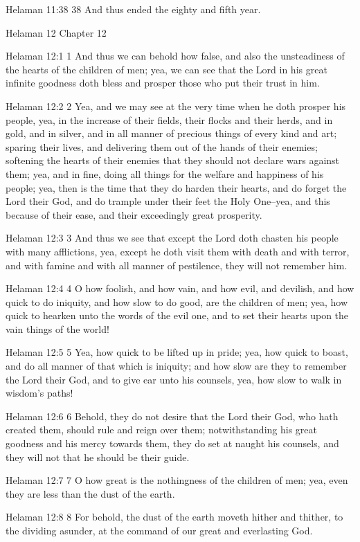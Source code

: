 Helaman 11:38
 38 And thus ended the eighty and fifth year.

Helaman 12
Chapter 12

Helaman 12:1
 1 And thus we can behold how false, and also the unsteadiness of
the hearts of the children of men; yea, we can see that the Lord
in his great infinite goodness doth bless and prosper those who
put their trust in him.

Helaman 12:2
 2 Yea, and we may see at the very time when he doth prosper his
people, yea, in the increase of their fields, their flocks and
their herds, and in gold, and in silver, and in all manner of
precious things of every kind and art; sparing their lives, and
delivering them out of the hands of their enemies; softening the
hearts of their enemies that they should not declare wars against
them; yea, and in fine, doing all things for the welfare and
happiness of his people; yea, then is the time that they do
harden their hearts, and do forget the Lord their God, and do
trample under their feet the Holy One--yea, and this because of
their ease, and their exceedingly great prosperity.

Helaman 12:3
 3 And thus we see that except the Lord doth chasten his people
with many afflictions, yea, except he doth visit them with death
and with terror, and with famine and with all manner of
pestilence, they will not remember him.

Helaman 12:4
 4 O how foolish, and how vain, and how evil, and devilish, and
how quick to do iniquity, and how slow to do good, are the
children of men; yea, how quick to hearken unto the words of the
evil one, and to set their hearts upon the vain things of the
world!

Helaman 12:5
 5 Yea, how quick to be lifted up in pride; yea, how quick to
boast, and do all manner of that which is iniquity; and how slow
are they to remember the Lord their God, and to give ear unto his
counsels, yea, how slow to walk in wisdom's paths!

Helaman 12:6
 6 Behold, they do not desire that the Lord their God, who hath
created them, should rule and reign over them; notwithstanding
his great goodness and his mercy towards them, they do set at
naught his counsels, and they will not that he should be their
guide.

Helaman 12:7
 7 O how great is the nothingness of the children of men; yea,
even they are less than the dust of the earth.

Helaman 12:8
 8 For behold, the dust of the earth moveth hither and thither,
to the dividing asunder, at the command of our great and
everlasting God.


